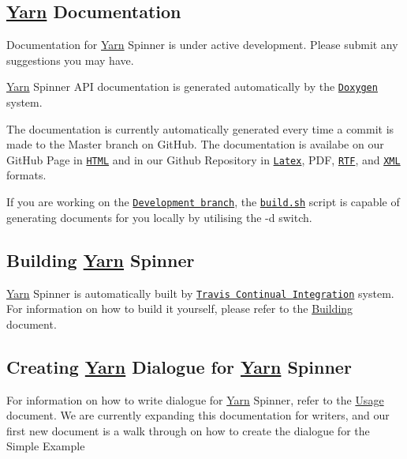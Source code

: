 \subsection*{\hyperlink{a00040}{Yarn} Documentation}

Documentation for \hyperlink{a00040}{Yarn} Spinner is under active development. Please submit any suggestions you may have.

\hyperlink{a00040}{Yarn} Spinner A\-P\-I documentation is generated automatically by the \href{http://www.doxygen.org}{\tt Doxygen} system.

The documentation is currently automatically generated every time a commit is made to the Master branch on Git\-Hub. The documentation is availabe on our Git\-Hub Page in \href{http://thesecretlab.github.io/YarnSpinner/html/}{\tt H\-T\-M\-L} and in our Github Repository in \href{https://github.com/thesecretlab/YarnSpinner/tree/gh-pages/latex}{\tt Latex}, P\-D\-F, \href{https://github.com/thesecretlab/YarnSpinner/tree/gh-pages/rtf}{\tt R\-T\-F}, and \href{https://github.com/thesecretlab/YarnSpinner/tree/gh-pages/xml}{\tt X\-M\-L} formats.

If you are working on the \href{https://github.com/thesecretlab/YarnSpinner/tree/development}{\tt Development branch}, the \href{../build.sh}{\tt build.\-sh} script is capable of generating documents for you locally by utilising the -\/d switch.

\subsection*{Building \hyperlink{a00040}{Yarn} Spinner}

\hyperlink{a00040}{Yarn} Spinner is automatically built by \href{https://travis-ci.org/thesecretlab/YarnSpinner}{\tt Travis Continual Integration} system. For information on how to build it yourself, please refer to the \hyperlink{a00119}{Building} document.

\subsection*{Creating \hyperlink{a00040}{Yarn} Dialogue for \hyperlink{a00040}{Yarn} Spinner}

For information on how to write dialogue for \hyperlink{a00040}{Yarn} Spinner, refer to the \hyperlink{a00116}{Usage} document. We are currently expanding this documentation for writers, and our first new document is a walk through on how to create the dialogue for the Simple Example


